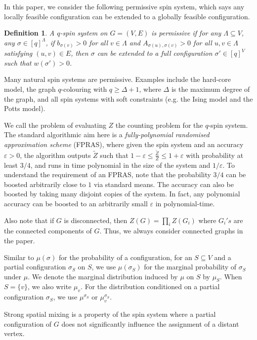 \documentclass[10pt,a4paper]{article}
\newtheorem{definition}{Definition}[section]
\newcommand{\eps}{\varepsilon}
\begin{document}
In this paper, we consider the following permissive spin system, which says any locally feasible configuration can be extended to a globally feasible configuration.
\begin{definition}
  A $q$-spin system on $G=(V,E)$ is permissive if for any $\Lambda \subseteq V$, any $\sigma \in [q]^\Lambda$, if $b_{\sigma(v)} > 0$ for all $v \in \Lambda$ and $A_{\sigma(u),\sigma(v)} > 0$ for all $u,v \in \Lambda$ satisfying $(u,v) \in E$, then $\sigma$ can be extended to a full configuration $\sigma' \in [q]^V$ such that $w(\sigma')>0$.
\end{definition}
Many natural spin systems are permissive. Examples include the hard-core model, the graph $q$-colouring with $q \geq \Delta + 1$, where $\Delta$ is the maximum degree of the graph, and all spin systems with soft constraints (e.g. the Ising model and the Potts model).

We call the problem of evaluating $Z$ the counting problem for the $q$-spin system.
The standard algorithmic aim here is a \emph{fully-polynomial randomised approximation scheme} (FPRAS),
where given the spin system and an accuracy $\eps>0$,
the algorithm outputs $\widetilde{Z}$ such that $1-\eps\le\frac{\widetilde{Z}}{Z}\le 1+\eps$ with probability at least $3/4$, and runs in time polynomial in the size of the system and $1/\eps$.
To understand the requirement of an FPRAS, note that the probability $3/4$ can be boosted arbitrarily close to $1$ via standard means.
The accuracy can also be boosted by taking many disjoint copies of the system.
In fact, any polynomial accuracy can be boosted to an arbitrarily small $\eps$ in polynomial-time.

Also note that if $G$ is disconnected, then $Z(G)=\prod_{i}Z(G_i)$ where $G_i's$ are the connected components of $G$.
Thus, we always consider connected graphs in the paper.

Similar to $\mu(\sigma)$ for the probability of a configuration, for an $S\subseteq V$ and a partial configuration $\sigma_S$ on $S$, we use $\mu(\sigma_S)$ for the marginal probability of $\sigma_S$ under $\mu$.
We denote the marginal distribution induced by $\mu$ on $S$ by $\mu_S$.
When $S=\{v\}$, we also write $\mu_v$. For the distribution conditioned on a partial configuration $\sigma_S$, we use $\mu^{\sigma_S}$ or $\mu_v^{\sigma_S}$. 

Strong spatial mixing is a property of the spin system where a partial configuration of $G$ does not significantly influence the assignment of a distant vertex. 
\end{document}
